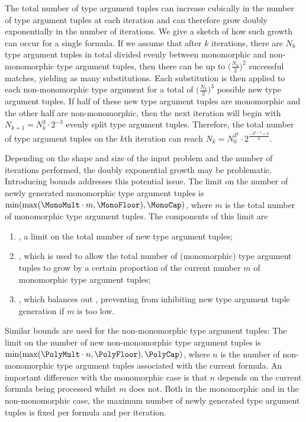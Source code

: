 \documentclass[runningheads]{llncs}
\begin{document}
The total number of type argument tuples can increase cubically in the number of type argument tuples at each iteration and can therefore grow doubly exponentially in the number of iterations. We give a sketch of how such growth can occur for a single formula. If we assume that after \(k\) iterations, there are \(N_k\) type argument tuples in total divided evenly between monomorphic and non-monomorphic type argument tuples, then there can be up to \(\bigl(\frac{N_k}{2}\bigr)^2\) successful matches, yielding as many substitutions. Each substitution is then applied to each non-monomorphic type argument for a total of \(\bigl(\frac{N_k}{2}\bigr)^3\) possible new type argument tuples. If half of these new type argument tuples are monomorphic and the other half are non-monomorphic, then the next iteration will begin with \(N_{k+1} = N_k^3 \cdot 2^{-3}\) evenly split type argument tuples. Therefore, the total number of type argument tuples on the \(k\)th iteration can reach \(N_k = N_0^{3^k} \cdot 2^{\frac{-3^{k+2}+3}{2}}\).

   Depending on the shape and size of the input problem and the number of iterations performed, the doubly exponential growth may be problematic. Introducing bounds addresses this potential issue. The limit on the number of newly generated monomorphic type argument tuples is \(\min(\max(\MonoMult\cdot m, \MonoFloor), \MonoCap)\), where \(m\) is the total number of monomorphic type argument tuples. The components of this limit are
\begin{enumerate}
   \item \MonoCap, a %
   limit on the total number of new type argument tuples;
   \item \MonoMult, which is used to allow the total number of (monomorphic) type argument tuples to grow by a certain proportion of the current number \(m\) of monomorphic type argument tuples;
   \item \MonoFloor, which balances out \MonoMult, preventing \MonoMult from inhibiting new type argument tuple generation if \(m\) is too low.
\end{enumerate}

Similar bounds are used for the non-monomorphic type argument tuples:
The limit on the number of new non-monomorphic type argument tuples is \(\min(\max(\PolyMult\cdot n, \PolyFloor),\allowbreak \PolyCap)\), where \(n\) is the number of non-monomorphic type argument tuples associated with the current formula. An important difference with the monomorphic case is that \(n\) depends on the current formula being processed whilst \(m\) does not.
Both in the monomorphic and in the non-monomorphic case, the maximum number of newly generated type argument tuples is fixed per formula and per iteration.
\end{document}
